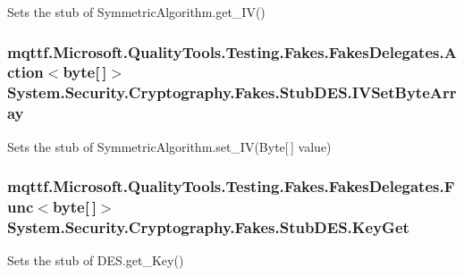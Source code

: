 Sets the stub of Symmetric\-Algorithm.\-get\-\_\-\-I\-V()

\hypertarget{class_system_1_1_security_1_1_cryptography_1_1_fakes_1_1_stub_d_e_s_a86ab6d2009e8be1a278d854afb570cb6}{
\subsubsection[{I\-V\-Set\-Byte\-Array}]{\setlength{\rightskip}{0pt plus 5cm}mqttf.\-Microsoft.\-Quality\-Tools.\-Testing.\-Fakes.\-Fakes\-Delegates.\-Action$<$byte\mbox{[}$\,$\mbox{]}$>$ System.\-Security.\-Cryptography.\-Fakes.\-Stub\-D\-E\-S.\-I\-V\-Set\-Byte\-Array}}\label{class_system_1_1_security_1_1_cryptography_1_1_fakes_1_1_stub_d_e_s_a86ab6d2009e8be1a278d854afb570cb6}


Sets the stub of Symmetric\-Algorithm.\-set\-\_\-\-I\-V(\-Byte\mbox{[}$\,$\mbox{]} value)

\hypertarget{class_system_1_1_security_1_1_cryptography_1_1_fakes_1_1_stub_d_e_s_a3c29414de56f0dd4696d729522cb88bf}{
\subsubsection[{Key\-Get}]{\setlength{\rightskip}{0pt plus 5cm}mqttf.\-Microsoft.\-Quality\-Tools.\-Testing.\-Fakes.\-Fakes\-Delegates.\-Func$<$byte\mbox{[}$\,$\mbox{]}$>$ System.\-Security.\-Cryptography.\-Fakes.\-Stub\-D\-E\-S.\-Key\-Get}}\label{class_system_1_1_security_1_1_cryptography_1_1_fakes_1_1_stub_d_e_s_a3c29414de56f0dd4696d729522cb88bf}


Sets the stub of D\-E\-S.\-get\-\_\-\-Key()

